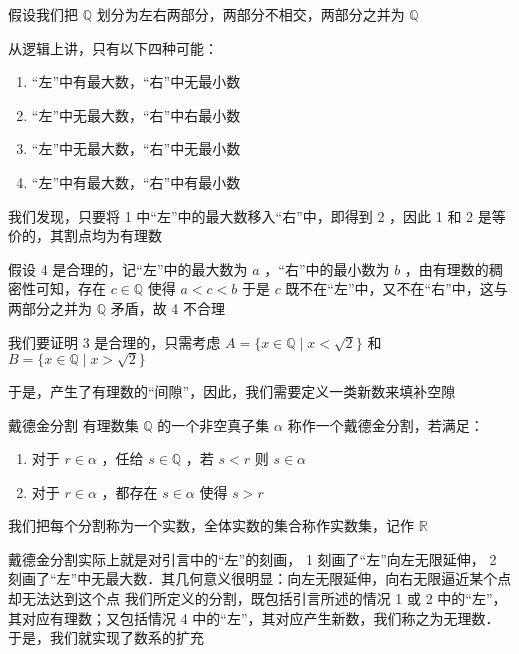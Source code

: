 
\begin{issues}
\issueTODO
\end{issues}


假设我们把 $\mathbb{Q}$ 划分为左右两部分，两部分不相交，两部分之并为 $\mathbb{Q}$

从逻辑上讲，只有以下四种可能：

\begin{enumerate}
\item “左”中有最大数，“右”中无最小数
\item “左”中无最大数，“右”中右最小数
\item “左”中无最大数，“右”中无最小数
\item “左”中有最大数，“右”中有最小数
\end{enumerate}
我们发现，只要将 1 中“左”中的最大数移入“右”中，即得到 2 ，因此 1 和 2 是等价的，其割点均为有理数

假设 4 是合理的，记“左”中的最大数为 $a$ ，“右”中的最小数为 $b$ ，由有理数的稠密性可知，存在 $c\in\mathbb{Q}$ 使得 $\displaystyle{a<c<b}$ 于是 $c$ 既不在“左”中，又不在“右”中，这与两部分之并为 $\mathbb{Q}$ 矛盾，故 4 不合理

我们要证明 3 是合理的，只需考虑 $A=\{x\in\mathbb{Q}\mid x<\sqrt{2}\}$ 和 $B=\{x\in\mathbb{Q}\mid x>\sqrt{2}\}$

于是，产生了有理数的“间隙”，因此，我们需要定义一类新数来填补空隙

\begin{definition}{戴德金分割}
有理数集 $\mathbb{Q}$ 的一个非空真子集 $\alpha$  称作一个戴德金分割，若满足：
\begin{enumerate}
\item 对于 $r\in \alpha$ ，任给 $s\in\mathbb{Q}$ ，若 $s<r$ 则 $s\in\alpha$ 
\item 对于 $r\in \alpha$ ，都存在 $s\in\alpha$ 使得 $s>r$ 
\end{enumerate}
我们把每个分割称为一个实数，全体实数的集合称作实数集，记作 $\mathbb{R}$ 
\end{definition}
戴德金分割实际上就是对引言中的“左”的刻画， 1 刻画了“左”向左无限延伸， 2 刻画了“左”中无最大数．其几何意义很明显：向左无限延伸，向右无限逼近某个点却无法达到这个点
我们所定义的分割，既包括引言所述的情况 1 或 2 中的“左”，其对应有理数；又包括情况 4 中的“左”，其对应产生新数，我们称之为无理数．于是，我们就实现了数系的扩充

